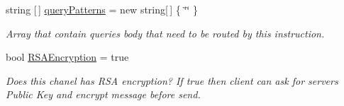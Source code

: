 \begin{DoxyCompactItemize}
string \mbox{[}$\,$\mbox{]} \mbox{\hyperlink{class_pipes_provider_1_1_networking_1_1_routing_1_1_instruction_aa98823848a42831095f92b639121cc67}{query\+Patterns}} = new string\mbox{[}$\,$\mbox{]} \{ \char`\"{}\char`\"{} \}
\begin{DoxyCompactList}\small\item\em Array that contain querie\textquotesingle{}s body that need to be routed by this instruction. \end{DoxyCompactList}\item 
bool \mbox{\hyperlink{class_pipes_provider_1_1_networking_1_1_routing_1_1_instruction_a61ce6ffa8bb9cc44efc57bc51be3550b}{R\+S\+A\+Encryption}} = true
\begin{DoxyCompactList}\small\item\em Does this chanel has R\+SA encryption? If true then client can ask for server\textquotesingle{}s Public Key and encrypt message before send. \end{DoxyCompactList}\end{DoxyCompactItemize}
